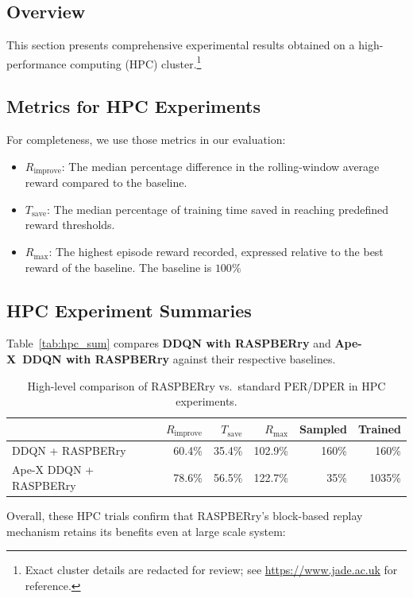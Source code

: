 \documentclass[10pt]{article} %
\begin{document}
\subsection{Overview}
This section presents comprehensive experimental results obtained on a high-performance computing (HPC) cluster.\footnote{Exact cluster details are redacted for review; see \url{https://www.jade.ac.uk} for reference.}

\subsection{Metrics for HPC Experiments}
For completeness, we use those metrics in our evaluation:
\begin{itemize}[leftmargin=*]
    \item $R_{\text{improve}}$: The median percentage difference in the rolling-window average reward compared to the baseline.
    \item $T_{\text{save}}$: The median percentage of training time saved in reaching predefined reward thresholds.
    \item $R_{\text{max}}$: The highest episode reward recorded, expressed relative to the best reward of the baseline.
    The baseline is $100\%$
\end{itemize}

\subsection{HPC Experiment Summaries}
Table~\ref{tab:hpc_sum} compares \textbf{DDQN with RASPBERry} and \textbf{Ape-X~DDQN with RASPBERry} against their respective baselines.

\begin{table}[h]
\centering
\begin{tabular}{lrrrrr}
\toprule
 & $R_{\text{improve}}$ & $T_{\text{save}}$ & $R_{\text{max}}$ & Sampled & Trained \\
\midrule
DDQN + RASPBERry      &  60.4\% & 35.4\% & 102.9\%  & 160\% & 160\% \\
Ape-X DDQN + RASPBERry &  78.6\% & 56.5\% & 122.7\%  &  35\% & 1035\%  \\
\bottomrule
\end{tabular}
\caption{High-level comparison of RASPBERry vs.\ standard PER/DPER in HPC experiments.}
\label{tab:sm_hpc_sum}
\end{table}

Overall, these HPC trials confirm that RASPBERry’s block-based replay mechanism retains its benefits even at large scale system: 
\end{document}
